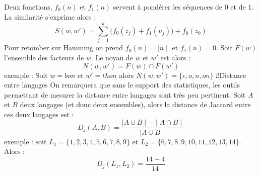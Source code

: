 \documentclass[a4paper,11pt]{article}
\begin{document}
  \p Deux fonctions, $f_0(n)$ et $f_1(n)$ servent à pondérer les séquences de
  $0$ et de $1$. La similarité s'exprime alors :
  \[
  S(w, w') = \sum^k_{j = 1}\bigg(f_0(z_j) + f_1(u_j)\bigg) + f_0(z_0)
  \]
  \p Pour retomber sur Hamming on prend $f_0(n) = \mid{}n\mid$ et $f_1(n) = 0$.
  Soit $F(w)$ l'ensemble des facteurs de $w$. Le noyau de $w$ et $w'$ est
  alors :
  \[
  N(w, w') = F(w) \cap F(w')
  \]
  \p exemple : Soit $w = bon$ et $w' = thon$ alors
  $N(w, w') = \{\epsilon, o, n, on\}$
 \ss{Distance entre langages}
 On remarquera que sans le support des statistiques, les outils
 permettant de mesurer la distance entre langages sont très peu
 pertinent.
  Soit $A$ et $B$ deux langages (et donc deux ensembles), alors la distance de
  Jaccard entre ces deux langages est :
  \[
  D_j(A, B) = \frac{\mid A \cup B \mid - \mid A \cap B \mid}{\mid A \cup B \mid}
  \]
  \p exemple : soit $L_1 = \{1, 2, 3, 4, 5, 6, 7, 8, 9\}$ et
  $L_2 = \{6, 7, 8, 9, 10, 11, 12, 13, 14\}$. Alors :
  \[
  D_j(L_1, L_2) = \frac{14 - 4}{14}
  \]
\end{document}
